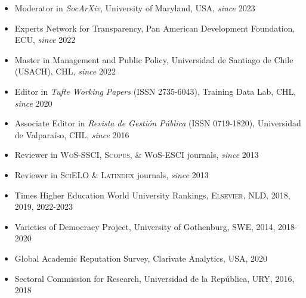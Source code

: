 





\begin{publications}

\begin{itemize}
\item{\small Moderator in {\itshape SocArXiv}, University of Maryland, USA, {\itshape since} 2023}
\item{\small Experts Network for Transparency, Pan American Development Foundation, ECU, {\itshape since} 2022}
\item{\small Master in Management and Public Policy, Universidad de Santiago de Chile (USACH), CHL, {\itshape since} 2022}
\item{\small Editor in {\itshape Tufte Working Papers} (ISSN 2735-6043), Training Data Lab, CHL, {\itshape since} 2020}
\item{\small Associate Editor in {\itshape Revista de Gestión Pública} (ISSN 0719-1820), Universidad de Valparaíso, CHL, {\itshape since} 2016}
\item{\small Reviewer in {\scshape WoS-SSCI}, {\scshape Scopus}, \& {\scshape WoS-ESCI} journals, {\itshape since} 2013}
\item{\small Reviewer in {\scshape SciELO} \& {\scshape Latindex} journals, {\itshape since} 2013}
\item{\small Times Higher Education World University Rankings, {\scshape Elsevier}, NLD, 2018, 2019, 2022-2023}
\item{\small Varieties of Democracy Project, University of Gothenburg, SWE, 2014, 2018-2020}
\item{\small Global Academic Reputation Survey, Clarivate Analytics, USA, 2020}
\item{\small Sectoral Commission for Research, Universidad de la República, URY, 2016, 2018}
\end{itemize}

\vspace{1mm}
\end{publications}
